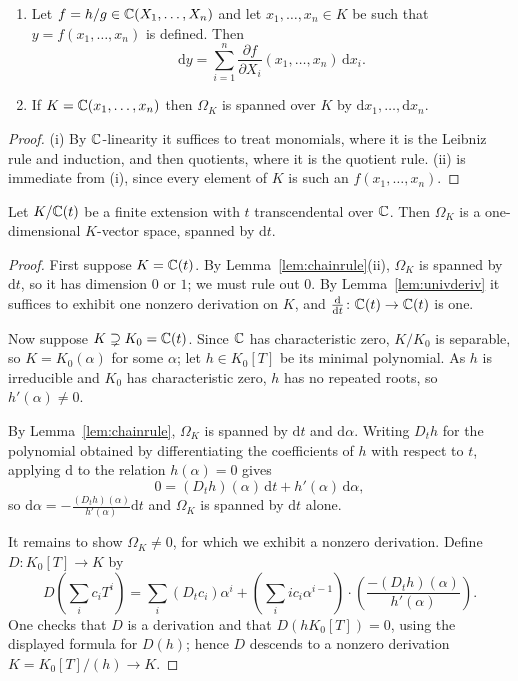 \documentclass[a4paper]{scrartcl}
\newcommand{\dee}{\mathrm{d}}
\begin{document}
\begin{lemma}\label{lem:chainrule}
	\begin{enumerate}[label=(\roman*)]
		\item Let $f = h/g \in \mathbb{C}(X_1,\dots,X_n)$ and let $x_1,\dots,x_n \in K$ be such that $y = f(x_1,\dots,x_n)$ is defined. Then
		$$\dee y = \sum_{i=1}^n \frac{\partial f}{\partial X_i}(x_1,\dots,x_n)\,\dee x_i.$$
		\item If $K = \mathbb{C}(x_1,\dots,x_n)$ then $\Omega_K$ is spanned over $K$ by $\dee x_1,\dots,\dee x_n$.
	\end{enumerate}
\end{lemma}

\begin{proof}
	(i) By $\mathbb{C}$-linearity it suffices to treat monomials, where it is the Leibniz rule and induction, and then quotients, where it is the quotient rule. (ii) is immediate from (i), since every element of $K$ is such an $f(x_1,\dots,x_n)$.
\end{proof}

\begin{theorem}\label{thm:omega1dim}
	Let $K/\mathbb{C}(t)$ be a finite extension with $t$ transcendental over $\mathbb{C}$. Then $\Omega_K$ is a one-dimensional $K$-vector space, spanned by $\dee t$.
\end{theorem}

\begin{proof}
	First suppose $K = \mathbb{C}(t)$. By Lemma~\ref{lem:chainrule}(ii), $\Omega_K$ is spanned by $\dee t$, so it has dimension $0$ or $1$; we must rule out $0$. By Lemma~\ref{lem:univderiv} it suffices to exhibit one nonzero derivation on $K$, and $\frac{\dee}{\dee t} \colon \C(t)\to\C(t)$ is one.

	Now suppose $K \supsetneq K_0 = \mathbb{C}(t)$. Since $\mathbb{C}$ has characteristic zero, $K/K_0$ is separable, so $K = K_0(\alpha)$ for some $\alpha$; let $h \in K_0[T]$ be its minimal polynomial. As $h$ is irreducible and $K_0$ has characteristic zero, $h$ has no repeated roots, so $h'(\alpha)\neq 0$.

	By Lemma~\ref{lem:chainrule}, $\Omega_K$ is spanned by $\dee t$ and $\dee\alpha$. Writing $D_th$ for the polynomial obtained by differentiating the coefficients of $h$ with respect to $t$, applying $\dee$ to the relation $h(\alpha) = 0$ gives
	$$0 = (D_th)(\alpha)\,\dee t + h'(\alpha)\,\dee\alpha,$$
	so $\dee\alpha = -\frac{(D_th)(\alpha)}{h'(\alpha)}\dee t$ and $\Omega_K$ is spanned by $\dee t$ alone.

	It remains to show $\Omega_K \neq 0$, for which we exhibit a nonzero derivation. Define $D \colon K_0[T]\to K$ by
	$$D\!\left(\sum_i c_iT^i\right) = \sum_i (D_tc_i)\alpha^i + \left(\sum_i ic_i\alpha^{i-1}\right)\cdot\left(\frac{-(D_th)(\alpha)}{h'(\alpha)}\right).$$
	One checks that $D$ is a derivation and that $D(h K_0[T]) = 0$, using the displayed formula for $D(h)$; hence $D$ descends to a nonzero derivation $K = K_0[T]/(h)\to K$.
\end{proof}
\end{document}
